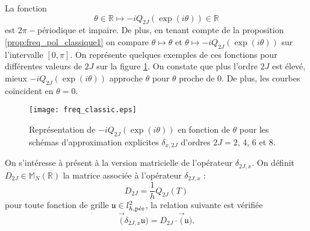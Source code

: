 La fonction
\begin{equation}
\theta \in \mathbb{R} \mapsto - i Q_{2J}(\exp(i \theta)) \in \mathbb{R}
\end{equation}
est $2 \pi -$périodique et impaire. De plus, en tenant compte de la proposition \ref{prop:freq_pol_classique1} on compare $\theta \mapsto \theta$  et $\theta \mapsto - i Q_{2J}(\exp(i \theta))$ sur l'intervalle $[0,\pi]$. On représente quelques exemples de ces fonctions pour différentes valeurs de $2J$ sur la figure \ref{fig:freq_classic}. On constate que plus l'ordre $2J$ est élevé, mieux $- i Q_{2J}(\exp(i \theta))$ approche $\theta$ pour $\theta$ proche de $0$. De plus, les courbes coïncident en $\theta = 0$.

\begin{figure}[htbp]
\begin{center}
\texttt{[image: freq\_classic.eps]}
\end{center}
\caption{Représentation de $-i Q_{2J}\left( \exp(i \theta) \right)$ en fonction de $\theta$ pour les schémas d'approximation explicites $\delta_{x,2J}$ d'ordres $2J = 2$, $4$, $6$ et $8$.}
\label{fig:freq_classic}
\end{figure}

On s'intéresse à présent à la version matricielle de l'opérateur $\delta_{2J,x}$. On définit $D_{2J} \in \mathbb{M}_N(\mathbb{R})$ la matrice associée à l'opérateur $\delta_{2J,x}$ :
\begin{equation}
D_{2J} = \dfrac{1}{h} Q_{2J}(T)
\label{eq:matrice_explicite}
\end{equation}
pour toute fonction de grille $\mathfrak{u} \in l^2_{h,\per}$, la relation suivante est vérifiée
\begin{equation}
\vec(\delta_{2J,x} \mathfrak{u}) = D_{2J} \cdot \vec ( \mathfrak{u} ).
\end{equation}

